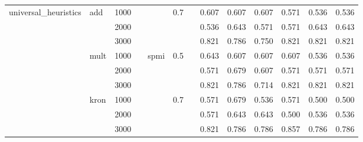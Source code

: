 \begin{tabular}{lllllllrrrrrr}
universal\_heuristics & add & 1000 &   &      & 0.7 &   &        0.607 &         0.607 &           0.607 &            0.571 &             0.536 &       0.536 \\
       & {} & 2000 &   &      &     &   &        0.536 &         0.643 &           0.571 &            0.571 &             0.643 &       0.643 \\
       & {} & 3000 &   &      &     &   &        0.821 &         0.786 &           0.750 &            0.821 &             0.821 &       0.821 \\
       & mult & 1000 &   & spmi & 0.5 &   &        0.643 &         0.607 &           0.607 &            0.607 &             0.536 &       0.536 \\
       & {} & 2000 &   &      &     &   &        0.571 &         0.679 &           0.607 &            0.571 &             0.571 &       0.571 \\
       & {} & 3000 &   &      &     &   &        0.821 &         0.786 &           0.714 &            0.821 &             0.821 &       0.821 \\
       & kron & 1000 &   &      & 0.7 &   &        0.571 &         0.679 &           0.536 &            0.571 &             0.500 &       0.500 \\
       & {} & 2000 &   &      &     &   &        0.571 &         0.643 &           0.643 &            0.500 &             0.536 &       0.536 \\
       & {} & 3000 &   &      &     &   &        0.821 &         0.786 &           0.786 &            0.857 &             0.786 &       0.786 \\
\bottomrule
\end{tabular}
